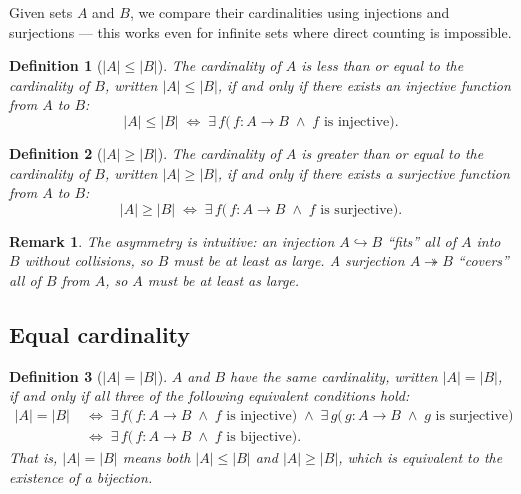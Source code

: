 \documentclass[11pt]{article}
\theoremstyle{defstyle}
\newtheorem{definition}{Definition}[section]
\theoremstyle{thmstyle}
\theoremstyle{notstyle}
\newtheorem*{remark}{Remark}
\theoremstyle{cautionstyle}
\begin{document}
Given sets $A$ and $B$, we compare their cardinalities using injections and surjections — this works even for infinite sets where direct counting is impossible.

\begin{defbox}
\begin{definition}[$|A| \leq |B|$]
The \emph{cardinality of $A$ is less than or equal to the cardinality of $B$}, written $|A| \leq |B|$, if and only if there exists an injective function from $A$ to $B$:
\[
  |A| \leq |B| \;\iff\; \exists\, f\bigl(\,f : A \to B \;\wedge\; f \text{ is injective}\bigr).
\]
\end{definition}
\end{defbox}

\begin{defbox}
\begin{definition}[$|A| \geq |B|$]
The \emph{cardinality of $A$ is greater than or equal to the cardinality of $B$}, written $|A| \geq |B|$, if and only if there exists a surjective function from $A$ to $B$:
\[
  |A| \geq |B| \;\iff\; \exists\, f\bigl(\,f : A \to B \;\wedge\; f \text{ is surjective}\bigr).
\]
\end{definition}
\end{defbox}

\begin{notebox}
\begin{remark}
The asymmetry is intuitive: an injection $A \hookrightarrow B$ ``fits'' all of $A$ into $B$ without collisions, so $B$ must be at least as large.  A surjection $A \twoheadrightarrow B$ ``covers'' all of $B$ from $A$, so $A$ must be at least as large.
\end{remark}
\end{notebox}

\subsection{Equal cardinality}

\begin{defbox}
\begin{definition}[$|A| = |B|$]
$A$ and $B$ have the \emph{same cardinality}, written $|A| = |B|$, if and only if \emph{all three} of the following equivalent conditions hold:
\begin{align*}
  |A| = |B|
  &\;\iff\; \exists\, f\bigl(\,f : A \to B \;\wedge\; f \text{ is injective}\bigr)
             \;\wedge\;
             \exists\, g\bigl(\,g : A \to B \;\wedge\; g \text{ is surjective}\bigr) \\[4pt]
  &\;\iff\; \exists\, f\bigl(\,f : A \to B \;\wedge\; f \text{ is bijective}\bigr).
\end{align*}
That is, $|A|=|B|$ means both $|A| \leq |B|$ and $|A| \geq |B|$, which is equivalent to the existence of a bijection.
\end{definition}
\end{defbox}
\end{document}
